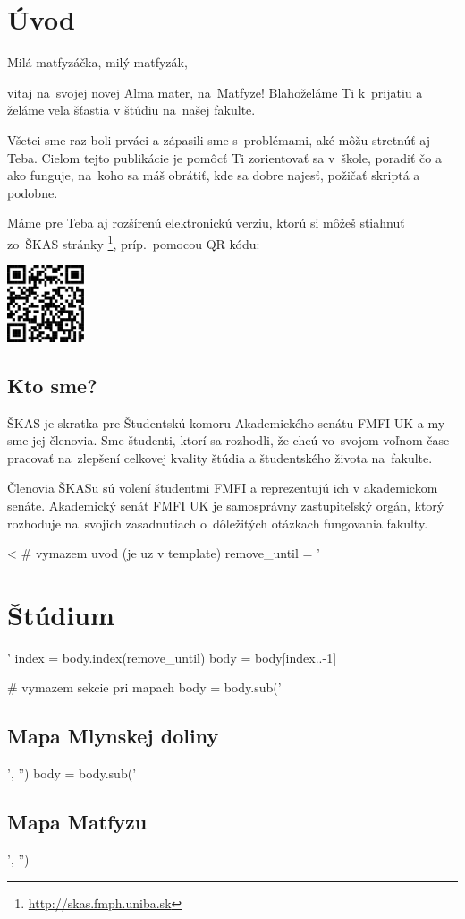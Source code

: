 \documentclass[11pt,slovak,twosides,openany]{scrbook}
\begin{document}
\chapter{Úvod}

Milá matfyzáčka, milý matfyzák,

vitaj na~svojej novej Alma mater, na~Matfyze! Blahoželáme Ti k~prijatiu
a želáme veľa šťastia v štúdiu na~našej fakulte.

Všetci sme raz boli prváci a zápasili sme s~problémami, aké môžu stretnúť
aj Teba. Cieľom tejto publikácie je pomôcť Ti zorientovať sa v~škole,
poradiť čo a ako funguje, na~koho sa máš obrátiť, kde sa dobre najesť,
požičať skriptá a podobne.

Máme pre Teba aj rozšírenú elektronickú verziu, ktorú si môžeš stiahnuť
zo~ŠKAS stránky%
\footnote{\href{http://skas.fmph.uniba.sk}{http://skas.fmph.uniba.sk}%
}, príp.\ pomocou QR kódu:

\begin{center}
\includegraphics[width=0.17\textwidth]{images/qr_code}
\par\end{center}

\section*{Kto sme?}

ŠKAS je skratka pre Študentskú komoru Akademického senátu FMFI UK
a my sme jej členovia. Sme študenti, ktorí sa rozhodli, že chcú vo~svojom
voľnom čase pracovať na~zlepšení celkovej kvality štúdia a študentského
života na~fakulte. 

Členovia ŠKASu sú volení študentmi FMFI a reprezentujú ich v akademickom
senáte. Akademický senát FMFI UK je samosprávny zastupiteľský orgán,
ktorý rozhoduje na svojich zasadnutiach o~dôležitých otázkach fungovania
fakulty. 

<%
# vymazem uvod (je uz v template)
remove_until = '\chapter{Štúdium}'
index = body.index(remove_until)
body = body[index..-1]

# vymazem sekcie pri mapach
body = body.sub('\section{Mapa Mlynskej doliny}\hypertarget{mapa-mlynskej-doliny}{}\label{mapa-mlynskej-doliny}', '')
body = body.sub('\section{Mapa Matfyzu}\hypertarget{mapa-matfyzu}{}\label{mapa-matfyzu}', '')
\end{document}
